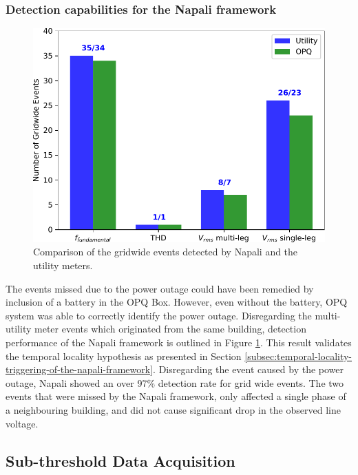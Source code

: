 \subsubsection{Detection capabilities for the Napali framework}
\begin{figure}[!ht]
    \centering
    \includegraphics[width=0.9\linewidth]{img/napali_eval/gt/money_plot1.pdf}
    \caption{Comparison of the gridwide events detected by Napali and the utility meters.}
    \label{expdes:fig:gt_money}
\end{figure}

The events missed due to the power outage could have been remedied by inclusion of a battery in the OPQ Box.
However, even without the battery, OPQ system was able to correctly identify the power outage.
Disregarding the multi-utility meter events which originated from the same building, detection performance of the Napali framework is outlined in Figure \ref{expdes:fig:gt_money}.
This result validates the temporal locality hypothesis as presented in Section \ref{subsec:temporal-locality-triggering-of-the-napali-framework}.
Disregarding the event caused by the power outage, Napali showed an over 97\% detection rate for grid wide events.
The two events that were missed by the Napali framework, only affected a single phase of a neighbouring building, and did not cause significant drop in the observed line voltage.



\subsection{Sub-threshold Data Acquisition}\label{subsec:sub-threshold-data-acquisition}

